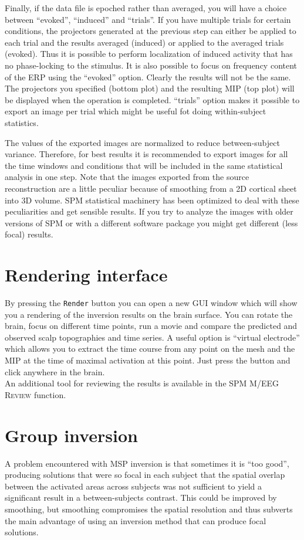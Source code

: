 Finally, if the data file is epoched rather than averaged, you will have a choice between ``evoked'', ``induced'' and ``trials''. If you have multiple trials for certain conditions, the projectors generated at the previous step can either be applied to each trial and the results averaged (induced) or applied to the averaged trials (evoked). Thus it is possible to perform localization of induced activity that has no phase-locking to the stimulus. It is also possible to focus on frequency content of the ERP using the ``evoked'' option. Clearly the results will not be the same. The projectors you specified (bottom plot) and the resulting MIP (top plot) will be displayed when the operation is completed. ``trials'' option makes it possible to export an image per trial which might be useful fot doing within-subject statistics.

The values of the exported images are normalized to reduce between-subject variance. Therefore, for best results it is recommended to export images for all the time windows and conditions that will be included in the same statistical analysis in one step. Note that the images exported from the source reconstruction are a little peculiar because of smoothing from a 2D cortical sheet into 3D volume. SPM statistical machinery has been optimized to deal with these peculiarities and get sensible results. If you try to analyze the images with older versions of SPM or with a different software package you might get different (less focal) results.

\section{Rendering interface}
By pressing the \texttt{Render} button you can open a new GUI window which will show you a rendering of the inversion results on the brain surface. You can rotate the brain, focus on different time points, run a movie and compare the predicted and observed scalp topographies and time series. A useful option is ``virtual electrode'' which allows you to extract the time course from any point on the mesh and the MIP at the time of maximal activation at this point. Just press the button and click anywhere in the brain.\\
An additional tool for reviewing the results is available in the SPM M/EEG \textsc{Review} function.

\section{Group inversion}
A problem encountered with MSP inversion is that sometimes it is ``too good'', producing solutions that were so focal in each subject that the spatial overlap between the activated areas across subjects was not sufficient to yield a significant result in a between-subjects contrast. This could be improved by smoothing, but smoothing compromises the spatial resolution and thus subverts the main advantage of using an inversion method that can produce focal solutions.

